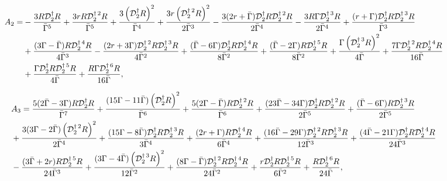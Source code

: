 \documentclass[aps,prd,amsmath,floats,floatfix, twocolumn,
superscriptaddress,nofootinbib,showpacs]{revtex4-1}
\begin{document}
\begin{widetext}
\begin{align}
    A_2 = &-\frac{3 R \mathcal{D}^{\dagger}_2 R}{\bar{\Gamma}^5} + \frac{3 r R  \mathcal{D}^{\dagger\,2}_2 R}{\bar{\Gamma}^5} + \frac{3 \left(\mathcal{D}^{\dagger}_2 R\right)^2}{\bar{\Gamma}^4}+ \frac{3 r \left(\mathcal{D}^{\dagger\,2}_2 R\right)^2 }{2 \bar{\Gamma}^3}  - \frac{3(2 r+ \bar{\Gamma}) \mathcal{D}^{\dagger}_2 R \mathcal{D}^{\dagger\,2}_2 R}{2\bar{\Gamma}^4}- \frac{3 R \Gamma \mathcal{D}^{\dagger\,3}_2 R}{2 \bar{\Gamma}^4} + \frac{(r+\Gamma) \mathcal{D}^{\dagger}_2 R \mathcal{D}^{\dagger\,3}_2 R}{\bar{\Gamma}^3} \notag \\
    &+ \frac{(3 \Gamma-\bar{\Gamma}) R  \mathcal{D}^{\dagger\,4}_2 R}{4 \bar{\Gamma}^3} - \frac{(2r+3\Gamma) \mathcal{D}^{\dagger\,2}_2 R \mathcal{D}^{\dagger\,3}_2 R}{4 \bar{\Gamma}^2} + \frac{(\bar{\Gamma}-6\Gamma)\mathcal{D}^{\dagger}_2 R  \mathcal{D}^{\dagger\,4}_2 R}{8 \bar{\Gamma}^2}+ \frac{(\bar{\Gamma}-2\Gamma) R  \mathcal{D}^{\dagger\,5}_2 R}{8 \bar{\Gamma}^2}+ \frac{\Gamma \left( \mathcal{D}^{\dagger\,3}_2 R\right)^2}{4 \bar{\Gamma}} + \frac{7 \Gamma \mathcal{D}^{\dagger\,2}_2 R \mathcal{D}^{\dagger\,4}_2 R}{16 \bar{\Gamma}} \notag \\
    & + \frac{\Gamma \mathcal{D}^{\dagger}_2 R \mathcal{D}^{\dagger\,5}_2 R}{4 \bar{\Gamma}} + \frac{R \Gamma \mathcal{D}^{\dagger\,6}_2 R}{16 \bar{\Gamma}},
\end{align}


\begin{align}
    &A_3=\frac{5(2\bar{\Gamma}-3 \Gamma) R \mathcal{D}^{\dagger}_2R}{\bar{\Gamma}^7} +
\frac{(15 \Gamma-11\bar{\Gamma}) \left(\mathcal{D}^{\dagger}_2R\right)^2}{\bar{\Gamma}^6} +
\frac{5(2 \Gamma- \bar{\Gamma}) R \mathcal{D}^{\dagger\,2}_2R}{\bar{\Gamma}^6}  +
\frac{(23\bar{\Gamma}-34\Gamma) \mathcal{D}^{\dagger}_2R \mathcal{D}^{\dagger\,2}_2R}{2\bar{\Gamma}^5}  +
\frac{(\bar{\Gamma}-6\Gamma)R \mathcal{D}^{\dagger\,3}_2R}{2\bar{\Gamma}^5} \notag \\
&+
\frac{3(3 \Gamma-2\bar{\Gamma})\left( \mathcal{D}^{\dagger\,2}_2R\right)^2}{2\bar{\Gamma}^4} +
\frac{(15 \Gamma-8\bar{\Gamma}) \mathcal{D}^{\dagger}_2R \mathcal{D}^{\dagger\,3}_2R}{3\bar{\Gamma}^4} +
\frac{(2 r+\Gamma) R \mathcal{D}^{\dagger\,4}_2R}{6\bar{\Gamma}^4}  +
\frac{(16\bar{\Gamma}-29\Gamma) \mathcal{D}^{\dagger\,2}_2R \mathcal{D}^{\dagger\,3}_2R}{12\bar{\Gamma}^3}  +
\frac{(4\bar{\Gamma}-21\Gamma)\mathcal{D}^{\dagger}_2R \mathcal{D}^{\dagger\,4}_2R}{24\bar{\Gamma}^3}\notag \\
&-
\frac{(3\bar{\Gamma}+2r) R \mathcal{D}^{\dagger\,5}_2R}{24\bar{\Gamma}^3}  +
\frac{(3\Gamma-4\bar{\Gamma})\left( \mathcal{D}^{\dagger\,3}_2R\right)^2}{12\bar{\Gamma}^2}  +
\frac{(8\Gamma-\bar{\Gamma}) \mathcal{D}^{\dagger\,2}_2R \mathcal{D}^{\dagger\,4}_2R}{24\bar{\Gamma}^2}  +
\frac{r \mathcal{D}^{\dagger}_2R \mathcal{D}^{\dagger\,5}_2R}{6\bar{\Gamma}^2} +
\frac{R \mathcal{D}^{\dagger\,6}_2R}{24\bar{\Gamma}},
\end{align}


\end{widetext}
\end{document}
